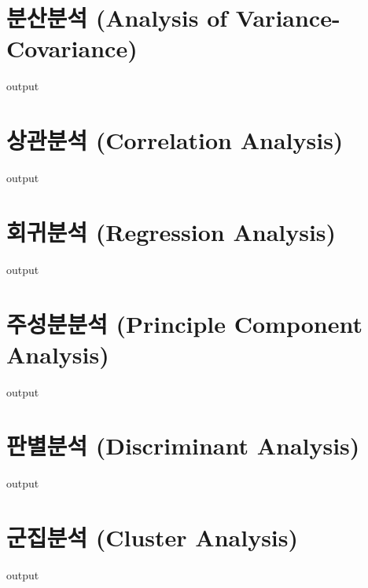 \documentclass{book}
\begin{document}
\section{분산분석 (Analysis of Variance-Covariance)}
\begin{Schunk}
\begin{Soutput}
output
\end{Soutput}
\end{Schunk}

\section{상관분석 (Correlation Analysis) }
\begin{Schunk}
\begin{Soutput}
output
\end{Soutput}
\end{Schunk}

\section{회귀분석 (Regression Analysis) }
\begin{Schunk}
\begin{Soutput}
output
\end{Soutput}
\end{Schunk}

\section{주성분분석 (Principle Component Analysis)}
\begin{Schunk}
\begin{Soutput}
output
\end{Soutput}
\end{Schunk}

\section{판별분석 (Discriminant Analysis) }
\begin{Schunk}
\begin{Soutput}
output
\end{Soutput}
\end{Schunk}

\section{군집분석 (Cluster Analysis) }
\begin{Schunk}
\begin{Soutput}
output
\end{Soutput}
\end{Schunk}
\end{document}
